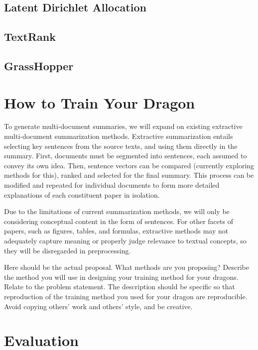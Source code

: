 \documentclass[conference]{sig-alternate-05-2015}
\begin{document}
\subsection{Latent Dirichlet Allocation}

\subsection{TextRank}

\subsection{GrassHopper}

\section{How to Train Your Dragon}\label{sec:design}

To generate multi-document summaries, we will expand on existing extractive multi-document summarization 
methods. Extractive summarization entails selecting key sentences from the source texts, and using them directly in the 
summary. First, documents must be segmented into sentences, each assumed to convey its own idea. Then, sentence vectors can be 
compared (currently exploring methods for this), ranked and selected for the final summary. This process can be modified 
and repeated for individual documents to form more detailed explanations of each constituent paper in isolation.

Due to the limitations of current summarization methods, we will only be considering 
conceptual content in the form of sentences. For other facets of papers, such as figures, tables, and formulas, extractive 
methods may not adequately capture meaning or properly judge relevance to textual concepts, so they will be 
disregarded in preprocessing.

Here should be the actual proposal. What methods are you proposing? Describe the method you will use in designing your training method for your dragons. Relate to the problem statement. The description should be specific so that reproduction of the training method you used for your dragon are reproducible. Avoid copying others' work and others' style, and be creative. 

\section{Evaluation}\label{sec:evaluation}
\end{document}
